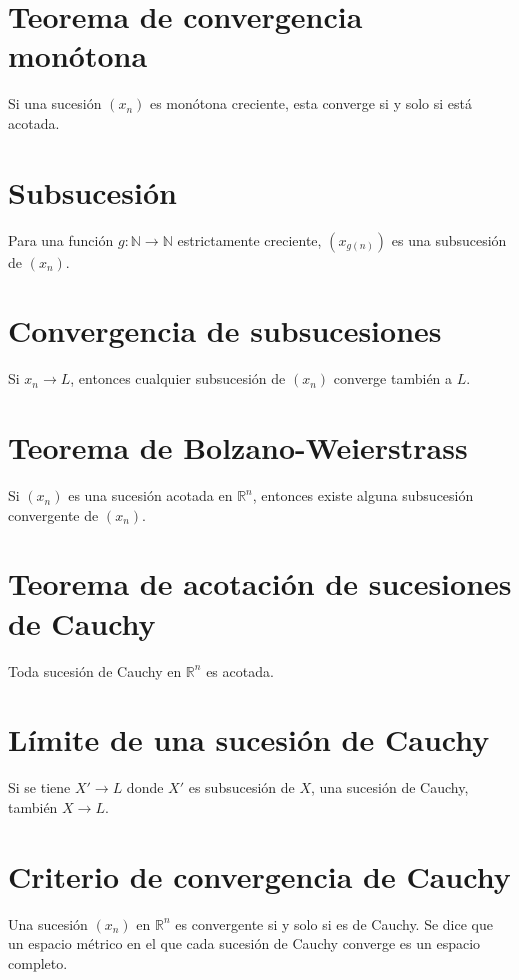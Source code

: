 \documentclass{article}
\begin{document}
\section*{Teorema de convergencia monótona}

Si una sucesión $(x_n)$ es monótona creciente, esta converge si y solo si está acotada.

\section*{Subsucesión}

Para una función $g:\mathbb{N}\to\mathbb{N}$ estrictamente creciente, $(x_{g(n)})$ es una subsucesión de $(x_n)$.

\section*{Convergencia de subsucesiones}

Si $x_n\to L$, entonces cualquier subsucesión de $(x_n)$ converge también a $L$.

\section*{Teorema de Bolzano-Weierstrass}

Si $(x_n)$ es una sucesión acotada en $\mathbb{R}^n$, entonces existe alguna subsucesión convergente de $(x_n)$.

\section*{Teorema de acotación de sucesiones de Cauchy}

Toda sucesión de Cauchy en $\mathbb{R}^n$ es acotada.

\section*{Límite de una sucesión de Cauchy}

Si se tiene $X'\to L$ donde $X'$ es subsucesión de $X$, una sucesión de Cauchy, también $X\to L$.

\section*{Criterio de convergencia de Cauchy}

Una sucesión $(x_n)$ en $\mathbb{R}^n$ es convergente si y solo si es de Cauchy. Se dice que un espacio métrico en el que cada sucesión de Cauchy converge es un espacio completo.
\end{document}
